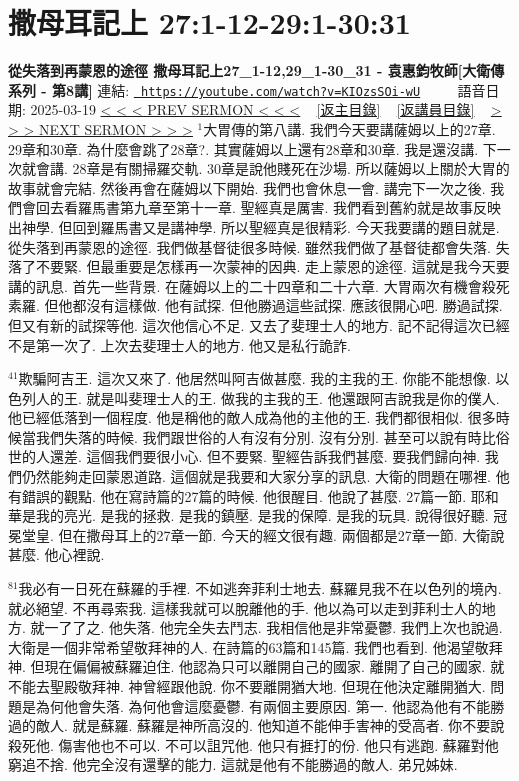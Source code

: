 \documentclass{book}
\begin{document}
\section{撒母耳記上 27:1-12-29:1-30:31}
\label{sec:KIOzsSOi_wU}
\textbf{從失落到再蒙恩的途徑 撒母耳記上27\_1-12,29\_1-30\_31 - 袁惠鈞牧師[大衛傳系列 - 第8講]}
\newline
\newline
連結: \href{https://youtube.com/watch?v=KIOzsSOi-wU}{\texttt{ https://youtube.com/watch?v=KIOzsSOi-wU}} ~~~~ 語音日期: 2025-03-19 
\newline
\newline
\hyperref[sec:86NlAlqZbEc]{< < < PREV SERMON < < <}
~
\hyperlink{toc}{[返主目錄]}
~
\hyperref[ch:preacher10]{[返講員目錄]}
~
\hyperref[sec:9ORA5941xxk]{> > > NEXT SERMON > > >}
\newline
\newline
$^{1}$大胃傳的第八講.
我們今天要講薩姆以上的27章.
29章和30章.
為什麼會跳了28章?.
其實薩姆以上還有28章和30章.
我是還沒講.
下一次就會講.
28章是有關掃羅交軌.
30章是說他賤死在沙場.
所以薩姆以上關於大胃的故事就會完結.
然後再會在薩姆以下開始.
我們也會休息一會.
講完下一次之後.
我們會回去看羅馬書第九章至第十一章.
聖經真是厲害.
我們看到舊約就是故事反映出神學.
但回到羅馬書又是講神學.
所以聖經真是很精彩.
今天我要講的題目就是.
從失落到再蒙恩的途徑.
我們做基督徒很多時候.
雖然我們做了基督徒都會失落.
失落了不要緊.
但最重要是怎樣再一次蒙神的因典.
走上蒙恩的途徑.
這就是我今天要講的訊息.
首先一些背景.
在薩姆以上的二十四章和二十六章.
大胃兩次有機會殺死素羅.
但他都沒有這樣做.
他有試探.
但他勝過這些試探.
應該很開心吧.
勝過試探.
但又有新的試探等他.
這次他信心不足.
又去了斐理士人的地方.
記不記得這次已經不是第一次了.
上次去斐理士人的地方.
他又是私行詭詐.

$^{41}$欺騙阿吉王.
這次又來了.
他居然叫阿吉做甚麼.
我的主我的王.
你能不能想像.
以色列人的王.
就是叫斐理士人的王.
做我的主我的王.
他還跟阿吉說我是你的僕人.
他已經低落到一個程度.
他是稱他的敵人成為他的主他的王.
我們都很相似.
很多時候當我們失落的時候.
我們跟世俗的人有沒有分別.
沒有分別.
甚至可以說有時比俗世的人還差.
這個我們要很小心.
但不要緊.
聖經告訴我們甚麼.
要我們歸向神.
我們仍然能夠走回蒙恩道路.
這個就是我要和大家分享的訊息.
大衛的問題在哪裡.
他有錯誤的觀點.
他在寫詩篇的27篇的時候.
他很醒目.
他說了甚麼.
27篇一節.
耶和華是我的亮光.
是我的拯救.
是我的鎮壓.
是我的保障.
是我的玩具.
說得很好聽.
冠冕堂皇.
但在撒母耳上的27章一節.
今天的經文很有趣.
兩個都是27章一節.
大衛說甚麼.
他心裡說.

$^{81}$我必有一日死在蘇羅的手裡.
不如逃奔菲利士地去.
蘇羅見我不在以色列的境內.
就必絕望.
不再尋索我.
這樣我就可以脫離他的手.
他以為可以走到菲利士人的地方.
就一了了之.
他失落.
他完全失去鬥志.
我相信他是非常憂鬱.
我們上次也說過.
大衛是一個非常希望敬拜神的人.
在詩篇的63篇和145篇.
我們也看到.
他渴望敬拜神.
但現在偏偏被蘇羅迫住.
他認為只可以離開自己的國家.
離開了自己的國家.
就不能去聖殿敬拜神.
神曾經跟他說.
你不要離開猶大地.
但現在他決定離開猶大.
問題是為何他會失落.
為何他會這麼憂鬱.
有兩個主要原因.
第一.
他認為他有不能勝過的敵人.
就是蘇羅.
蘇羅是神所高沒的.
他知道不能伸手害神的受高者.
你不要說殺死他.
傷害他也不可以.
不可以詛咒他.
他只有捱打的份.
他只有逃跑.
蘇羅對他窮追不捨.
他完全沒有還擊的能力.
這就是他有不能勝過的敵人.
弟兄姊妹.
\end{document}

